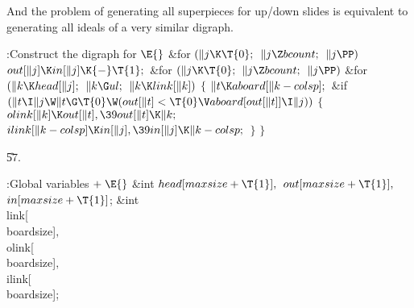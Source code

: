 And the problem of generating all superpieces for up/down
slides
is equivalent to generating all ideals of a very similar digraph.

\Y\B\4:Construct the digraph for \X${}\E{}$\6
\&{for} ${}(\|j\K\T{0};{}$ ${}\|j\Z\\{bcount};{}$ ${}\|j\PP){}$\1\5
${}\\{out}[\|j]\K\\{in}[\|j]\K{-}\T{1};{}$\2\6
\&{for} ${}(\|j\K\T{0};{}$ ${}\|j\Z\\{bcount};{}$ ${}\|j\PP){}$\1\6
\&{for} ${}(\|k\K\\{head}[\|j];{}$ ${}\|k\G\\{ul};{}$ ${}\|k\K\\{link}[\|k]){}$%
\5
${}\{{}$\1\6
${}\|t\K\\{aboard}[\|k-\\{colsp}];{}$\6
\&{if} ${}(\|t\I\|j\W\|t\G\T{0}\W(\\{out}[\|t]<\T{0}\V\\{aboard}[\\{out}[\|t]]%
\I\|j)){}$\5
${}\{{}$\1\6
${}\\{olink}[\|k]\K\\{out}[\|t],\39\\{out}[\|t]\K\|k;{}$\6
${}\\{ilink}[\|k-\\{colsp}]\K\\{in}[\|j],\39\\{in}[\|j]\K\|k-\\{colsp};{}$\6
\4${}\}{}$\2\6
\4${}\}{}$\2\2\par
\U57.\fi

\B{}:Global variables\X${}\mathrel+\E{}$\6
\&{int} ${}\\{head}[\\{maxsize}+\T{1}],{}$ ${}\\{out}[\\{maxsize}+\T{1}],{}$
${}\\{in}[\\{maxsize}+\T{1}]{}$;\6
\&{int} \\{link}[\\{boardsize}]${},{}$ \\{olink}[\\{boardsize}]${},{}$ %
\\{ilink}[\\{boardsize}];\par
\fi

